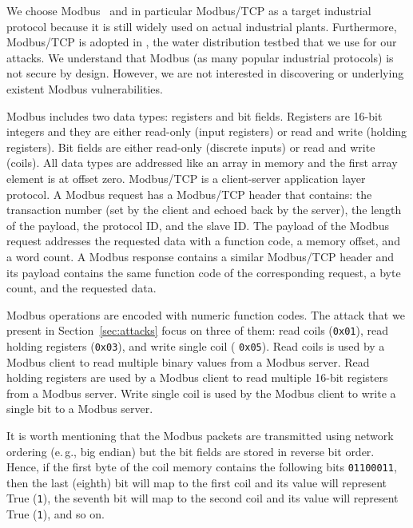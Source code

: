 \documentclass[sigconf]{acmart}
\makeatletter
\newcommand{\eg}{e.\@\,g.,\@\xspace}
\newcommand{\Botnet}{CPSBot\@\xspace}
\makeatother
\begin{document}
We choose Modbus~\cite{modbus} and in particular Modbus/TCP as a target
industrial protocol because it is still widely used on actual industrial
plants\cite{modbus-usage}. Furthermore, Modbus/TCP is  adopted in \wadi,
the water distribution testbed that we use for our attacks. We understand
that Modbus (as many popular industrial protocols) is not secure by design.
However, we are not interested in discovering or underlying existent Modbus
vulnerabilities.


Modbus includes two data types: registers and bit fields.
Registers are 16-bit integers and they are either read-only (input registers)
or read and write (holding registers). Bit fields are either read-only
(discrete inputs) or read and write (coils). All data types are addressed like
an array in memory and the first array element is at offset zero. Modbus/TCP is
a client-server application layer protocol. A Modbus request has a Modbus/TCP
header that contains: the transaction number (set by the client and echoed
back by the server), the length of the payload, the protocol ID, and the slave
ID. The payload of the Modbus request addresses the requested data with a function
code, a memory offset, and a word count. A Modbus response contains a similar
Modbus/TCP header and its payload contains the same function code of the
corresponding request, a byte count, and the requested data.

Modbus operations are encoded with numeric function codes. The attack that
we present in Section~\ref{sec:attacks} focus on three of them: read coils
(\texttt{0x01}), read holding registers (\texttt{0x03}), and write single
coil ( \texttt{0x05}). Read coils is used by a Modbus client to read multiple
binary values from a Modbus server. Read holding registers are used by a Modbus
client to read multiple 16-bit registers from a Modbus server. Write single
coil is used by the Modbus client to write a single bit to a Modbus server.

It is worth mentioning that the Modbus packets are transmitted using network
ordering (\eg big endian) but the bit fields are stored in reverse bit order.
Hence, if the first byte of the coil memory contains the following bits
\texttt{01100011}, then the last (eighth) bit will map to the first coil and
its value will represent True (\texttt{1}), the seventh bit will map to the
second coil and its value will represent True (\texttt{1}), and so on.
\end{document}
